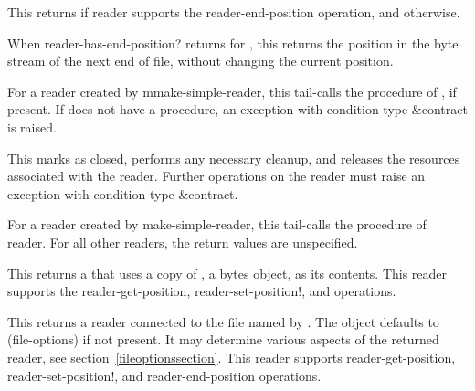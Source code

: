 \begin{entry}{%
}
   
This returns \schtrue{} if reader supports the {\cf reader-end-position}
operation, and \schfalse{} otherwise.
\end{entry}   

\begin{entry}{%
}
   
When {\cf reader-has-end-position?} returns \schtrue{} for ,
this returns the position in the byte stream of the next end of file,
without changing the current position.
   
For a reader created by {\cf mmake-simple-reader}, this tail-calls the
 procedure of , if present. If
 does not have a  procedure, an
exception with condition type {\cf\&contract} is raised.
\end{entry}

\begin{entry}{%
}
   
This marks  as closed, performs any necessary cleanup, and
releases the resources associated with the reader. Further operations
on the reader must raise an exception with condition type
{\cf\&contract}.
   
For a reader created by {\cf make-simple-reader}, this tail-calls the
 procedure of reader.  For all other readers, the return
values are unspecified.
\end{entry}

\begin{entry}{%
}

This returns a  that uses a copy of
, a bytes object, as its contents. This reader supports
the {\cf reader-get-position}, {\cf reader-set-position!}, and 
operations.
\end{entry}

\begin{entry}{%
}
   
This returns a reader connected to the file named by .
The  object defaults to {\cf (file-options)} if not
present. It may determine various aspects of the returned reader, see
section~\ref{fileoptionssection}. This reader supports {\cf reader-get-position},
{\cf reader-set-position!}, and {\cf reader-end-position} operations.
\end{entry} 

